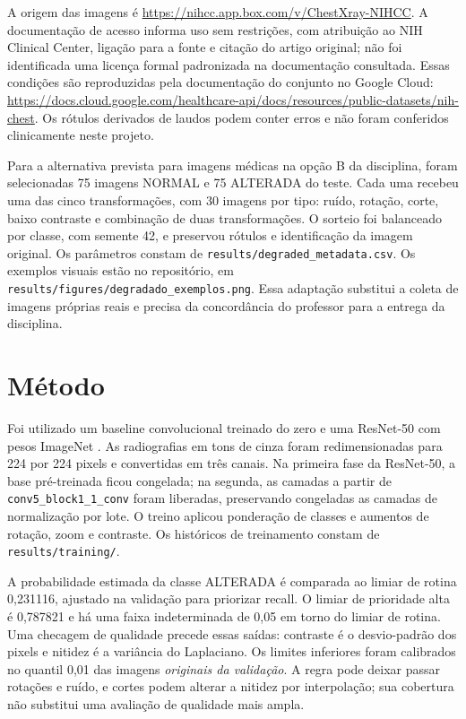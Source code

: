 \documentclass[12pt]{article}
\begin{document}
A origem das imagens é \url{https://nihcc.app.box.com/v/ChestXray-NIHCC}. A documentação de acesso informa uso sem restrições, com atribuição ao NIH Clinical Center, ligação para a fonte e citação do artigo original; não foi identificada uma licença formal padronizada na documentação consultada. Essas condições são reproduzidas pela documentação do conjunto no Google Cloud: \url{https://docs.cloud.google.com/healthcare-api/docs/resources/public-datasets/nih-chest}. Os rótulos derivados de laudos podem conter erros e não foram conferidos clinicamente neste projeto.

Para a alternativa prevista para imagens médicas na opção B da disciplina, foram selecionadas 75 imagens NORMAL e 75 ALTERADA do teste. Cada uma recebeu uma das cinco transformações, com 30 imagens por tipo: ruído, rotação, corte, baixo contraste e combinação de duas transformações. O sorteio foi balanceado por classe, com semente 42, e preservou rótulos e identificação da imagem original. Os parâmetros constam de \texttt{results/degraded\_metadata.csv}. Os exemplos visuais estão no repositório, em \texttt{results/figures/degradado\_exemplos.png}. Essa adaptação substitui a coleta de imagens próprias reais e precisa da concordância do professor para a entrega da disciplina.

\section{Método}
Foi utilizado um baseline convolucional treinado do zero e uma ResNet-50 com pesos ImageNet \cite{he2016resnet,deng2009imagenet}. As radiografias em tons de cinza foram redimensionadas para 224 por 224 pixels e convertidas em três canais. Na primeira fase da ResNet-50, a base pré-treinada ficou congelada; na segunda, as camadas a partir de \texttt{conv5\_block1\_1\_conv} foram liberadas, preservando congeladas as camadas de normalização por lote. O treino aplicou ponderação de classes e aumentos de rotação, zoom e contraste. Os históricos de treinamento constam de \texttt{results/training/}.

A probabilidade estimada da classe ALTERADA é comparada ao limiar de rotina 0,231116, ajustado na validação para priorizar recall. O limiar de prioridade alta é 0,787821 e há uma faixa indeterminada de 0,05 em torno do limiar de rotina. Uma checagem de qualidade precede essas saídas: contraste é o desvio-padrão dos pixels e nitidez é a variância do Laplaciano. Os limites inferiores foram calibrados no quantil 0,01 das imagens \emph{originais da validação}. A regra pode deixar passar rotações e ruído, e cortes podem alterar a nitidez por interpolação; sua cobertura não substitui uma avaliação de qualidade mais ampla.
\end{document}
